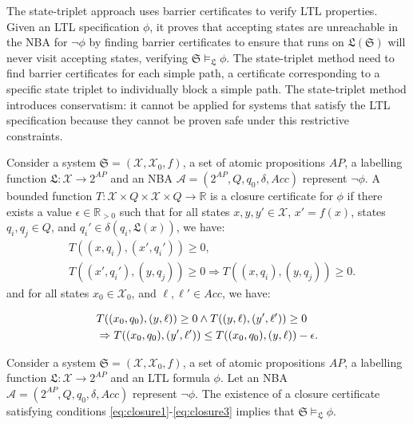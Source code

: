 The state-triplet approach\cite{wongpiromsarn2015automata} uses barrier certificates to verify LTL properties. Given an LTL specification $\phi$, it proves that accepting states are unreachable in the NBA for $\neg\phi$ by finding barrier certificates to ensure that runs on $\mathfrak{L}(\mathfrak{S})$ will never visit accepting states, verifying $\mathfrak{S} \models_{\mathfrak{L}} \phi$. The state-triplet method need to find barrier certificates for each simple path, a certificate corresponding to a specific state triplet to individually block a simple path. The state-triplet method introduces conservatism: it cannot be applied for systems that satisfy the LTL specification because they cannot be proven safe under this restrictive constraints.


\begin{definition}
\label{LTLCC}
Consider a system $\mathfrak{S} = (\mathcal{X}, \mathcal{X}_0, f)$, a set of atomic propositions $AP$, a labelling function $\mathfrak{L} : \mathcal{X} \rightarrow 2^{AP}$ and an NBA $\mathcal{A} = (2^{AP}, Q, q_0, \delta, Acc)$ represent $\neg \phi$. A bounded function $T : \mathcal{X} \times Q \times \mathcal{X} \times Q \rightarrow \mathbb{R}$ is a closure certificate for $\phi$ if there exists a value $\epsilon \in \mathbb{R}_{> 0}$ such that for all states $x, y, y' \in \mathcal{X}$, $x' = f(x)$, states $q_i, q_j \in Q$, and $q_i' \in \delta(q_i, \mathfrak{L}(x))$, we have:
\begin{align}
    &T((x, q_i), (x', q_i')) \geq 0, \label{eq:closure1} \\
    &T((x', q_i'), (y, q_j)) \geq 0 \Rightarrow T((x, q_i), (y, q_j)) \geq 0. \label{eq:closure2}
\end{align}
and for all states $x_0 \in \mathcal{X}_0$, and $\ell, \ell' \in Acc$, we have:

\begin{align}
  & T((x_0, q_0), (y, \ell)) \geq 0 \land T((y, \ell), (y', \ell')) \geq 0 \notag \\
  &\Rightarrow T((x_0, q_0), (y', \ell')) \leq T((x_0, q_0), (y, \ell)) - \epsilon. \label{eq:closure3}
\end{align}
\end{definition}

\begin{theorem}
Consider a system $\mathfrak{S}=(\mathcal{X}, \mathcal{X}_0, f)$, a set of atomic propositions $AP$, a labelling function $\mathfrak{L}: \mathcal{X} \rightarrow 2^{AP}$ and an LTL formula $\phi$. Let an NBA $\mathcal{A} = (2^{AP}, Q, q_0, \delta, Acc)$ represent $\neg \phi$. The existence of a closure certificate satisfying conditions \eqref{eq:closure1}-\eqref{eq:closure3} implies that $\mathfrak{S} \models_\mathfrak{L} \phi$.
\end{theorem}

